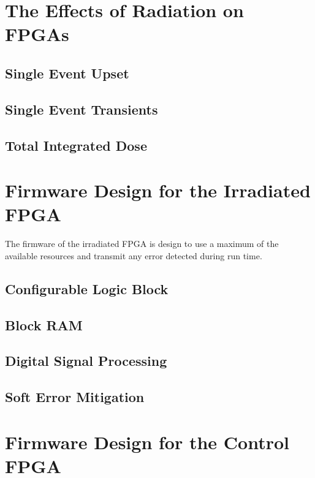   \section{The Effects of Radiation on FPGAs}

    \subsection{Single Event Upset}

    \subsection{Single Event Transients}

    \subsection{Total Integrated Dose}

  \section{Firmware Design for the Irradiated FPGA}

    The firmware of the irradiated FPGA is design to use a maximum of the available resources and transmit any error detected during run time.

    \subsection{Configurable Logic Block}

    \subsection{Block RAM}

    \subsection{Digital Signal Processing}

    \subsection{Soft Error Mitigation}

  \section{Firmware Design for the Control FPGA}

